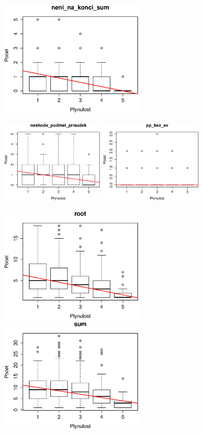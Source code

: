 \documentclass[12pt,a4paper]{report}
\begin{document}
\includegraphics[width=70mm]{./grafy/rysy/neni_na_konci_sum.eps}


\includegraphics[width=50mm]{./grafy/rysy/neshoda_podmet_prisudek.eps}
\includegraphics[width=50mm]{./grafy/rysy/pp_bez_av.eps}


\includegraphics[width=70mm]{./grafy/rysy/root.eps}
\includegraphics[width=70mm]{./grafy/rysy/sum.eps}
\end{document}
